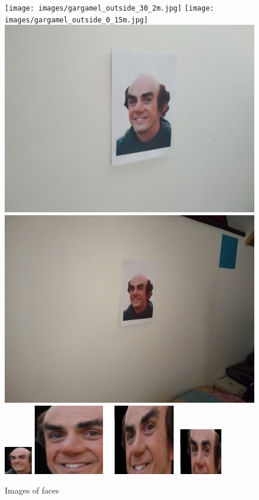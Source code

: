\documentclass[12pt,a4paper]{article}
\begin{document}
    \begin{figure}[H]
        \centering
        \texttt{[image: images/gargamel\_outside\_30\_2m.jpg]}
        \texttt{[image: images/gargamel\_outside\_0\_15m.jpg]}
        \includegraphics[width=.20\linewidth]{images/gargamel_inside_30_light.jpg}
        \includegraphics[width=.20\linewidth]{images/gargamel_inside_30_dark.jpg} \\
        \vspace{3pt}
        \includegraphics[width=.20\linewidth]{images/gargamel_simulation_01.jpg}
        \includegraphics[width=.20\linewidth]{images/gargamel_simulation_02.jpg}
        \includegraphics[width=.20\linewidth]{images/gargamel_simulation_03.jpg}
        \includegraphics[width=.20\linewidth]{images/gargamel_simulation_04.jpg}
        \caption{Images of faces}
    \end{figure}
\end{document}
